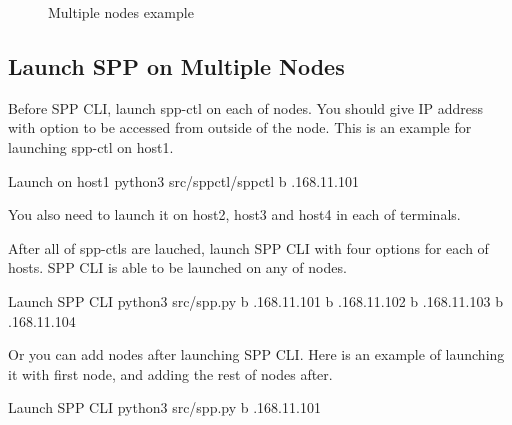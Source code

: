 \documentclass[a4paper,11pt,openany,oneside,english]{sphinxmanual}
\begin{document}
\begin{figure}[htbp]
\centering
\capstart

\noindent{}
\caption{Multiple nodes example}\label{\detokenize{usecases/multi_nodes:id1}}\label{\detokenize{usecases/multi_nodes:figure-spp-multi-nodes-vhost}}\end{figure}


\subsection{Launch SPP on Multiple Nodes}
\label{\detokenize{usecases/multi_nodes:launch-spp-on-multiple-nodes}}
Before SPP CLI, launch spp-ctl on each of nodes. You should give IP address
with  option to be accessed from outside of the node.
This is an example for launching spp-ctl on host1.

\begin{sphinxVerbatim}[commandchars=\\\{\},formatcom=\footnotesize]
 Launch on host1
 python3 src/spp\PYGZhy{}ctl/spp\PYGZhy{}ctl \PYGZhy{}b .168.11.101
\end{sphinxVerbatim}

You also need to launch it on host2, host3 and host4 in each of terminals.

After all of spp-ctls are lauched, launch SPP CLI with four  options
for each of hosts. SPP CLI is able to be launched on any of nodes.

\begin{sphinxVerbatim}[commandchars=\\\{\},formatcom=\footnotesize]
 Launch SPP CLI
 python3 src/spp.py \PYGZhy{}b .168.11.101 
    \PYGZhy{}b .168.11.102 
    \PYGZhy{}b .168.11.103 
    \PYGZhy{}b .168.11.104 
\end{sphinxVerbatim}

Or you can add nodes after launching SPP CLI. Here is an example of
launching it with first node, and adding the rest of nodes after.

\begin{sphinxVerbatim}[commandchars=\\\{\},formatcom=\footnotesize]
 Launch SPP CLI
 python3 src/spp.py \PYGZhy{}b .168.11.101

\end{sphinxVerbatim}
\end{document}
